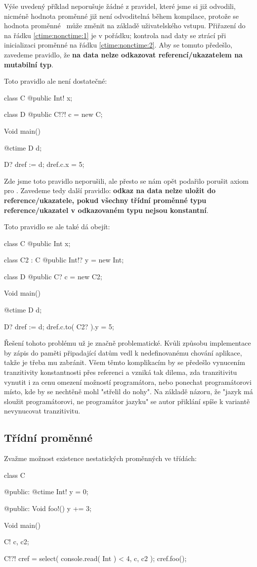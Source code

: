 Výše uvedený příklad neporušuje žádné z pravidel, které jsme si již odvodili, nicméně hodnota proměnné  již není odvoditelná během kompilace, protože se hodnota proměnné ~může změnit na základě uživatelského vstupu. Přiřazení do  na řádku \ref{ctime:nonctime:1} je v pořádku; kontrola nad daty se ztrácí při inicializaci proměnné  na řádku \ref{ctime:nonctime:2}. Aby se tomuto předešlo, zavedeme pravidlo, že \textbf{na \ctime data nelze odkazovat \nonctime referencí/ukazatelem na mutabilní typ}.

Toto pravidlo ale není dostatečné:
\begin{code}
class C {
	@public Int! x;
}

class D {
	@public C!?! c = new C;
}

Void main() {
	@ctime D d;
	
	D? dref := d;
	dref.c.x = 5;
}
\end{code}

Zde jsme toto pravidlo neporušili, ale přesto se nám opět podařilo porušit axiom pro \ctime. Zavedeme tedy další pravidlo: \textbf{odkaz na \ctime data nelze uložit do \nonctime reference/ukazatele, pokud všechny třídní proměnné typu reference/ukazatel v odkazovaném typu nejsou konstantní}.

Toto pravidlo se ale také dá obejít:
\begin{code}
class C {
	@public Int x;
}

class C2 : C {
	@public Int!? y = new Int;
}

class D {
	@public C? c = new C2;
}

Void main() {
	@ctime D d;
	
	D? dref := d;
	dref.c.to( C2? ).y = 5;
}
\end{code}

Řešení tohoto problému už je značně problematické. Kvůli způsobu implementace by zápis do paměti připadající \ctime datům vedl k nedefinovanému chování aplikace, takže je třeba mu zabránit. Všem těmto komplikacím by se předešlo vynucením tranzitivity konstantnosti přes referenci a vzniká tak dilema, zda tranzitivitu vynutit i za cenu omezení možností programátora, nebo ponechat programátorovi místo, kde by se nechtěně mohl "střelil do nohy". Na základě názoru, že "jazyk má sloužit programátorovi, ne programátor jazyku" se autor přiklání spíše k variantě nevynucovat tranzitivitu.

\subsection{Třídní \ctime proměnné}
Zvažme možnost existence nestatických \ctime proměnných ve třídách:
\begin{code}
class C {
	
@public:
	@ctime Int! y = 0;
	
@public:
	Void foo!() {
		y += 3;
	}
	
}

Void main() {
	C! c, c2;
	
	C!?! cref = select( console.read( Int ) < 4, c, c2 );
	cref.foo();
}
\end{code}

